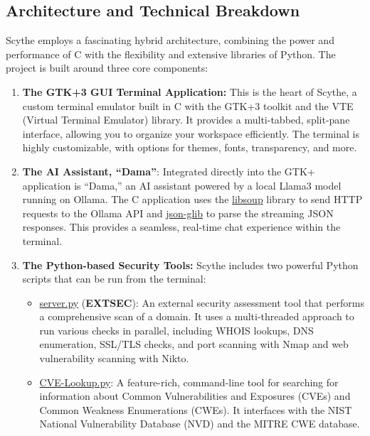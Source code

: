 \documentclass{article}
\begin{document}
\subsection{Architecture and Technical Breakdown}\label{architecture-and-technical-breakdown}

Scythe employs a fascinating hybrid architecture, combining the power
and performance of C with the flexibility and extensive libraries of
Python. The project is built around three core components:

\begin{enumerate}
\item
  \textbf{The GTK+3 GUI Terminal Application:} This is the heart of
  Scythe, a custom terminal emulator built in C with the GTK+3 toolkit
  and the VTE (Virtual Terminal Emulator) library. It provides a
  multi-tabbed, split-pane interface, allowing you to organize your
  workspace efficiently. The terminal is highly customizable, with
  options for themes, fonts, transparency, and more.
\item
  \textbf{The AI Assistant, ``Dama''}: Integrated directly into the GTK+
  application is ``Dama,'' an AI assistant powered by a local Llama3
  model running on Ollama. The C application uses the \url{libsoup}
  library to send HTTP requests to the Ollama API and \url{json-glib}
  to parse the streaming JSON responses. This provides a seamless,
  real-time chat experience within the terminal.
\item
  \textbf{The Python-based Security Tools:} Scythe includes two powerful
  Python scripts that can be run from the terminal:

  \begin{itemize}
  \item
    \url{server.py} (\textbf{EXTSEC}): An external security
    assessment tool that performs a comprehensive scan of a domain. It
    uses a multi-threaded approach to run various checks in parallel,
    including WHOIS lookups, DNS enumeration, SSL/TLS checks, and port
    scanning with Nmap and web vulnerability scanning with Nikto.
  \item
    \url{CVE-Lookup.py}: A feature-rich, command-line tool for
    searching for information about Common Vulnerabilities and Exposures
    (CVEs) and Common Weakness Enumerations (CWEs). It interfaces with
    the NIST National Vulnerability Database (NVD) and the MITRE CWE
    database.
  \end{itemize}
\end{enumerate}
\end{document}
